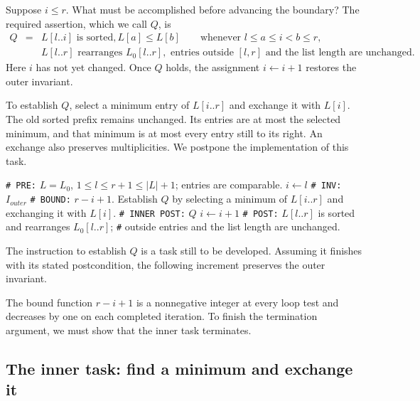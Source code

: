 Suppose $i\leq r$. What must be accomplished before advancing the
boundary? The required assertion, which we call $Q$, is
\[
\begin{array}{lcl}
Q & = & L[l..i]\text{ is sorted},
L[a]\leq L[b]\qquad
\text{whenever }l\leq a\leq i<b\leq r,\\
&&L[l..r]\text{ rearranges }L_0[l..r], 
\text{ entries outside }[l,r]\text{ and the list length are unchanged}.
\end{array}
\]
Here $i$ has not yet changed. Once $Q$ holds, the assignment
$i\leftarrow i+1$ restores the outer invariant.

To establish $Q$, select a minimum entry of $L[i..r]$ and exchange
it with $L[i]$. The old sorted prefix remains unchanged. Its entries
are at most the selected minimum, and that minimum is at most every
entry still to its right. An exchange also preserves multiplicities.
We postpone the implementation of this task.

\begin{algorithm}[H]
\begin{algorithmic}[1]
\Statex \texttt{\# PRE:} $L=L_0$,
$1\leq l\leq r+1\leq |L|+1$; entries are comparable.
\State $i\leftarrow l$
\Statex \texttt{\# INV:} $I_{outer}$
\Statex \texttt{\# BOUND:} $r-i+1$.
    \State Establish $Q$ by selecting a minimum of $L[i..r]$
    and exchanging it with $L[i]$.
    \Statex \hspace{0.45in} \texttt{\# INNER POST:} $Q$ 
    \State $i\leftarrow i+1$
\EndWhile
\Statex \texttt{\# POST:} $L[l..r]$ is sorted and rearranges $L_0[l..r]$;
\Statex \texttt{\#} outside entries and the list length are unchanged.
\EndProcedure
\end{algorithmic}
\caption{The outer loop, with the inner task specified  (Statement 4) but not yet implemented.}
\end{algorithm}

The instruction to establish $Q$ is a task still to be developed.
Assuming it finishes with its stated postcondition, the following
increment preserves the outer invariant.

The bound function $r-i+1$ is a nonnegative integer at every loop
test and decreases by one on each completed iteration. To finish
the termination argument, we must show that the inner task terminates.

\subsection{The inner task: find a minimum and exchange it}

